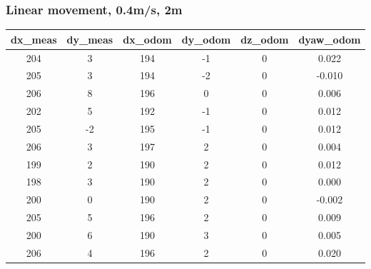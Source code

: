 \documentclass[a4paper, 12pt]{article}
\begin{document}
    \subsubsection{Linear movement, 0.4m/s, 2m}
    \begin{table}[H]
    \scriptsize
    \begin{tabular}{@{}cccccc@{}}
    \toprule
    \textbf{dx\_meas} & \textbf{dy\_meas} & \textbf{dx\_odom} & \textbf{dy\_odom} & \textbf{dz\_odom} & \textbf{dyaw\_odom} \\ \midrule
    204                   & 3                     & 194               & -1                & 0                 & 0.022               \\
    205                   & 3                     & 194               & -2                & 0                 & -0.010              \\
    206                   & 8                     & 196               & 0                 & 0                 & 0.006               \\
    202                   & 5                     & 192               & -1                & 0                 & 0.012               \\
    205                   & -2                    & 195               & -1                & 0                 & 0.012               \\
    206                   & 3                     & 197               & 2                 & 0                 & 0.004               \\
    199                   & 2                     & 190               & 2                 & 0                 & 0.012               \\
    198                   & 3                     & 190               & 2                 & 0                 & 0.000               \\
    200                   & 0                     & 190               & 2                 & 0                 & -0.002              \\
    205                   & 5                     & 196               & 2                 & 0                 & 0.009               \\
    200                   & 6                     & 190               & 3                 & 0                 & 0.005               \\
    206                   & 4                     & 196               & 2                 & 0                 & 0.020               \\

\end{tabular}
\end{table}
\end{document}
